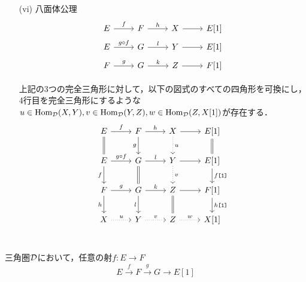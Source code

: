 \begin{defn}
\begin{itemize}
	\item[(vi)]
		八面体公理\\
			\[
				\begin{tikzcd}[row sep=5pt]
			E \ar[r,"f"]& F\ar[r,"h"]& X \ar[r]& E[1]\\
			E \ar[r,"g\circ f"]& G\ar[r,"l"]& Y \ar[r]& E[1]\\
			F \ar[r,"g"]& G\ar[r,"k"]& Z \ar[r]& F[1]\\
		\end{tikzcd}
			\]
			上記の3つの完全三角形に対して，以下の図式のすべての四角形を可換にし，4行目を完全三角形にするような$u\in\operatorname{\mathrm{Hom}}_{{\mathcal D}}(X,Y),v\in\operatorname{\mathrm{Hom}}_{{\mathcal D}}(Y,Z),w\in\operatorname{\mathrm{Hom}}_{{\mathcal D}}(Z,X[1])$が存在する．
			\[
		\begin{tikzcd}
			E \ar[r,"f"]\ar[d,equal]& F\ar[r,"h"]\ar[d,"g",swap]& X\ar[d,"u",dotted] \ar[r]& E[1]\ar[d,equal]\\
			E \ar[r,"g\circ f"]\ar[d,"f",swap]& G\ar[r,"l"]\ar[d,equal]& Y\ar[d,"v",dotted] \ar[r]& E[1]\ar[d,"f\texttt{[1]}"]\\
			F \ar[r,"g"]\ar[d,"h",swap]& G\ar[r,"k"]\ar[d,"l",swap]& Z \ar[r]\ar[d,equal]& F[1]\ar[d,"h\texttt{[1]}"]\\
			X \ar[r,"u",dotted]& Y\ar[r,"v",dotted]& Z \ar[r,"w",dotted]& X[1]\\
		\end{tikzcd}
			\]
	\end{itemize}
\end{defn}

\begin{lemm}
	三角圏${\mathcal D}$において，任意の射$f\colon E\rightarrow F$
	\[E\xrightarrow{f} F\xrightarrow{g} G\rightarrow E[1]\]
\end{lemm}

